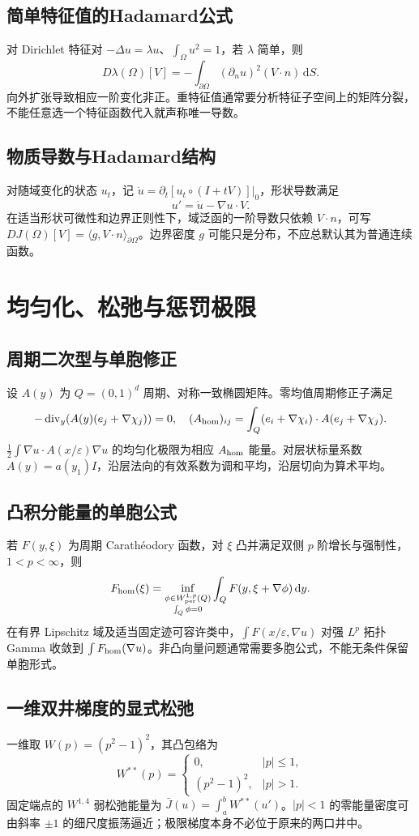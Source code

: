 \documentclass[../main.tex]{subfiles}
\begin{document}
\subsection{简单特征值的Hadamard公式}
对 Dirichlet 特征对 $-\Delta u=\lambda u$、$\int_\Omega u^2=1$，若 $\lambda$ 简单，则
\[
D\lambda(\Omega)[V]=-\int_{\partial\Omega}(\partial_nu)^2(V\cdot n)\,\mathrm dS.
\]
向外扩张导致相应一阶变化非正。重特征值通常要分析特征子空间上的矩阵分裂，不能任意选一个特征函数代入就声称唯一导数。
\subsection{物质导数与Hadamard结构}
对随域变化的状态 $u_t$，记 $\dot u=\left.\partial_t[u_t\circ(I+tV)]\right|_0$，形状导数满足
\[
u'=\dot u-\nabla u\cdot V.
\]
在适当形状可微性和边界正则性下，域泛函的一阶导数只依赖 $V\cdot n$，可写 $DJ(\Omega)[V]=\langle g,V\cdot n\rangle_{\partial\Omega}$。边界密度 $g$ 可能只是分布，不应总默认其为普通连续函数。
\section{均匀化、松弛与惩罚极限}
\subsection{周期二次型与单胞修正}
设 $A(y)$ 为 $Q=(0,1)^d$ 周期、对称一致椭圆矩阵。零均值周期修正子满足
\[
-\operatorname{div}_y(A(y)(e_j+\nabla\chi_j))=0,
\quad (A_{\rm hom})_{ij}=\int_Q(e_i+\nabla\chi_i)\cdot A(e_j+\nabla\chi_j).
\]
$\frac12\int\nabla u\cdot A(x/\varepsilon)\nabla u$ 的均匀化极限为相应 $A_{\rm hom}$ 能量。对层状标量系数 $A(y)=a(y_1)I$，沿层法向的有效系数为调和平均，沿层切向为算术平均。
\subsection{凸积分能量的单胞公式}
若 $F(y,\xi)$ 为周期 Carathéodory 函数，对 $\xi$ 凸并满足双侧 $p$ 阶增长与强制性，$1<p<\infty$，则
\[
F_{\rm hom}(\xi)=\inf_{\substack{\phi\in W_{\rm per}^{1,p}(Q)\\\int_Q\phi=0}}
\int_QF(y,\xi+\nabla\phi)\,\mathrm dy.
\]
在有界 Lipschitz 域及适当固定迹可容许类中，$\int F(x/\varepsilon,\nabla u)$ 对强 $L^p$ 拓扑 Gamma 收敛到 $\int F_{\rm hom}(\nabla u)$。非凸向量问题通常需要多胞公式，不能无条件保留单胞形式。
\subsection{一维双井梯度的显式松弛}
一维取 $W(p)=(p^2-1)^2$，其凸包络为
\[
W^{**}(p)=\begin{cases}0,&|p|\le1,\\(p^2-1)^2,&|p|>1.\end{cases}
\]
固定端点的 $W^{1,4}$ 弱松弛能量为 $\bar J(u)=\int_a^bW^{**}(u')$。$|p|<1$ 的零能量密度可由斜率 $\pm1$ 的细尺度振荡逼近；极限梯度本身不必位于原来的两口井中。
\end{document}
